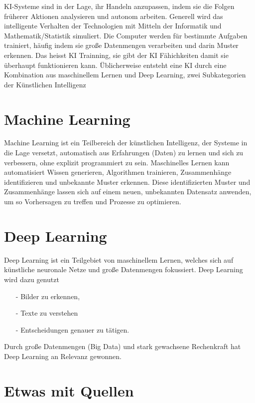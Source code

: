 \documentclass{report}
\begin{document}
KI-Systeme sind in der Lage, ihr Handeln anzupassen, indem sie die Folgen früherer Aktionen analysieren und autonom arbeiten.
 Generell wird das intelligente Verhalten der 
Technologien mit Mitteln der Informatik und Mathematik/Statistik simuliert.
 Die Computer werden für bestimmte Aufgaben trainiert, häufig indem sie große Datenmengen 
 verarbeiten und darin Muster erkennen. Das heisst KI Trainning, sie gibt der KI Fähichkeiten damit sie überhaupt funktionieren kann. 
 Üblicherweise entsteht eine KI durch eine Kombination aus maschinellem Lernen und Deep Learning, zwei Subkategorien der Künstlichen Intelligenz

 \section{Machine Learning}
 Machine Learning ist ein Teilbereich der künstlichen Intelligenz, der Systeme in die Lage versetzt, automatisch 
 aus Erfahrungen (Daten) zu lernen und sich zu verbessern, ohne explizit programmiert zu sein.
 Maschinelles Lernen kann automatisiert Wissen generieren, Algorithmen trainieren, Zusammenhänge identifizieren und unbekannte Muster erkennen. 
 Diese identifizierten Muster und Zusammenhänge lassen sich auf einem neuen, unbekannten Datensatz anwenden, 
 um so Vorhersagen zu treffen und Prozesse zu optimieren.

 \section{Deep Learning} 
  Deep Learning ist ein Teilgebiet von maschinellem Lernen, 
  welches sich auf künstliche neuronale Netze und große Datenmengen fokussiert. Deep Learning wird dazu genutzt
  \begin{itemize}
    \item[-] Bilder zu erkennen,
    \item[-]Texte zu verstehen
    \item[-]Entscheidungen genauer zu tätigen.
    \end{itemize}
  Durch große Datenmengen (Big Data) und stark gewachsene Rechenkraft hat Deep Learning an Relevanz gewonnen.









\section{Etwas mit Quellen}
\end{document}
